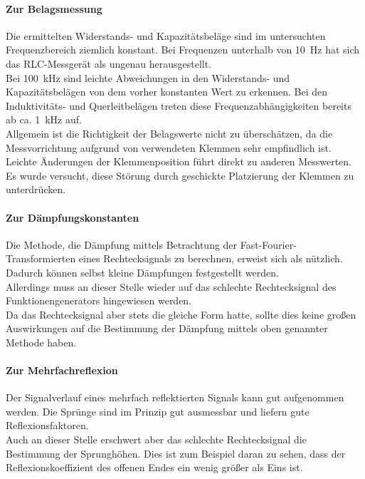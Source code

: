 \paragraph{Zur Belagsmessung}
Die ermittelten Widerstands- und Kapazitätsbeläge 
sind im untersuchten Frequenzbereich 
ziemlich konstant. Bei Frequenzen unterhalb von 
\SI{10}{\hertz} hat sich das RLC-Messgerät als ungenau 
herausgestellt.\\
Bei \SI{100}{\kilo\hertz} sind leichte Abweichungen in den 
Widerstands- und Kapazitätsbelägen von dem vorher konstanten Wert 
zu erkennen. Bei den Induktivitäts- und Querleitbelägen treten diese 
Frequenzabhängigkeiten bereits ab ca. \SI{1}{\kilo\hertz} auf.\\
Allgemein ist die Richtigkeit der Belagswerte nicht zu überschätzen, 
da die Messvorrichtung aufgrund von verwendeten Klemmen sehr 
empfindlich ist. Leichte Änderungen der Klemmenposition führt direkt 
zu anderen Messwerten. Es wurde versucht, diese Störung durch 
geschickte Platzierung der Klemmen zu unterdrücken.\\

\paragraph{Zur Dämpfungskonstanten}
Die Methode, die Dämpfung mittels Betrachtung der 
Fast-Fourier-Transformierten eines Rechtecksignals zu berechnen, 
erweist sich als nützlich. Dadurch können selbst kleine Dämpfungen 
festgestellt werden.\\
Allerdings muss an dieser Stelle wieder auf das schlechte 
Rechtecksignal des Funktionengenerators hingewiesen werden.\\
Da das Rechtecksignal aber stets die gleiche Form hatte, sollte 
dies keine großen Auswirkungen auf die Bestimmung der Dämpfung 
mittels oben genannter Methode haben.\\

\paragraph{Zur Mehrfachreflexion}
Der Signalverlauf eines mehrfach reflektierten Signals 
kann gut aufgenommen werden. Die Sprünge sind im Prinzip 
gut ausmessbar und liefern gute Reflexionsfaktoren.\\
Auch an dieser Stelle erschwert aber das schlechte Rechtecksignal 
die Bestimmung der Sprunghöhen. Dies ist zum Beispiel daran zu 
sehen, dass der Reflexionskoeffizient des offenen Endes ein wenig 
größer als Eins ist.\\

